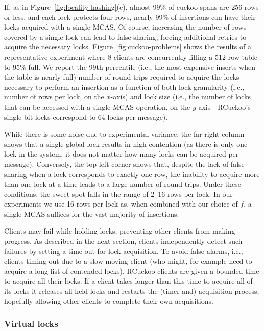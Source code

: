 If, as in Figure~\ref{fig:locality-hashing}(c), almost 99\% of cuckoo
spans are 256 rows or less, and each lock protects four rows, nearly
99\% of insertions can have their locks acquired with a single MCAS.
Of course, increasing the number of rows covered by a single lock can
lead to false sharing, forcing additional retries to acquire the
necessary locks.
%
Figure~\ref{fig:cuckoo-problems} shows the results of a
representative experiment where 8 clients are concurrently
filling a 512-row table to 95\% full.  We report the
99th-percentile (i.e., the most expensive inserts when the
table is nearly full) number of round trips required to
acquire the locks necessary to perform an insertion as a
function of both lock granularity (i.e., number of rows per
lock, on the $x$-axis) and lock size (i.e., the number of
locks that can be accessed with a single MCAS operation, on
the $y$-axis---RCuckoo's single-bit locks correspond to 64
locks per message).

While there is some noise due to experimental variance, the far-right
column shows that a single global lock results in high contention (as
there is only one lock in the system, it does not matter how many
locks can be acquired per message).  Conversely, the top left corner shows
that, despite the lack of false sharing when a lock corresponds to
exactly one row, the inability to acquire more than one lock at a time
leads to a large number of round trips.  Under these conditions, the
sweet spot falls in the range of 2--16 rows per lock.  In our
experiments we use 16 rows per lock as, when combined with our choice of
$f$, a single MCAS suffices for the vast majority of insertions.

%
Clients may fail while holding locks, preventing other clients from
making progress.  As described in the next section, clients
independently detect such failures by setting a time out for lock
acquisition. To avoid false alarms, i.e., clients timing out due to a
slow-moving client (who might, for example need to acquire a long list
of contended locks), RCuckoo clients are given a bounded time to
acquire all their locks. If a client takes longer than this time to
acquire all of its locks it releases all held locks and restarts the
(timer and) acquisition process, hopefully allowing other clients to
complete their own acquisitions.


\subsubsection{Virtual locks}

